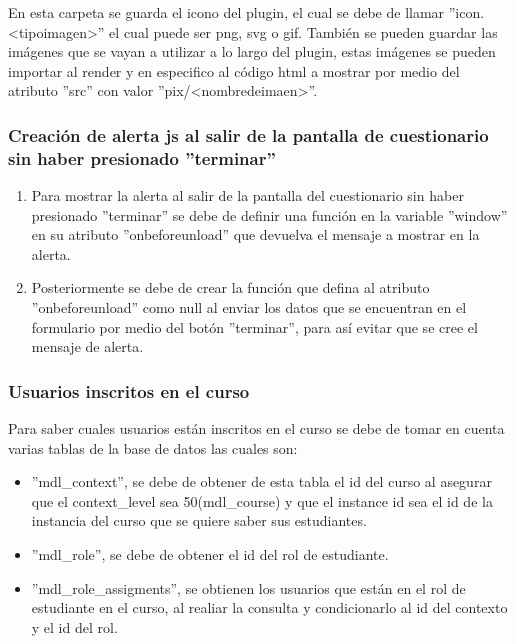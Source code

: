 			En esta carpeta se guarda el icono del plugin, el cual se debe de llamar ''icon.<tipoimagen>'' el cual puede ser png, svg o gif.
			También se pueden guardar las imágenes que se vayan a utilizar a lo largo del plugin, estas imágenes se pueden importar al render y en especifico al código html a mostrar por medio del atributo ''src'' con valor ''pix/<nombredeimaen>''.

	\subsubsection{Creación de alerta js al salir de la pantalla de cuestionario sin haber presionado ''terminar''}

    \begin{enumerate}
      \item Para mostrar la alerta al salir de la pantalla del cuestionario sin haber presionado ''terminar'' se debe de definir una función en la variable ''window'' en su atributo ''onbeforeunload'' que devuelva el mensaje a mostrar en la alerta.
      \item Posteriormente se debe de crear la función que defina al atributo ''onbeforeunload'' como null al enviar los datos que se encuentran en el formulario por medio del botón ''terminar'', para así evitar que se cree el mensaje de alerta.
    \end{enumerate}


  \subsubsection{Usuarios inscritos en el curso}
		Para saber cuales usuarios están inscritos en el curso se debe de tomar en cuenta varias tablas de la base de datos las cuales son:
    \begin{itemize}
      \item ''mdl\_context'', se debe de obtener de esta tabla el id del curso al asegurar que el context\_level sea 50(mdl\_course) y que el instance id sea el id de la instancia del curso que se quiere saber sus estudiantes.
      \item ''mdl\_role'', se debe de obtener el id del rol de estudiante.
      \item ''mdl\_role\_assigments'', se obtienen los usuarios que están en el rol de estudiante en el curso, al realiar la consulta y condicionarlo al id del contexto y el id del rol.
    \end{itemize}
